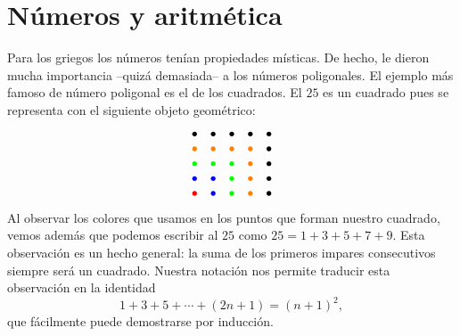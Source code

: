 \chapter{Números y aritmética}

Para los griegos los números tenían propiedades místicas. De hecho, le dieron
mucha importancia --quizá demasiada-- a los números poligonales.  El ejemplo
más famoso de número poligonal es el de los cuadrados. El $25$ es un cuadrado
pues se representa con el siguiente objeto geométrico:
\[
\begin{array}{ccccc}
	\bullet & \bullet & \bullet & \bullet & \bullet\\
	\textcolor{orange}{\bullet} & \textcolor{orange}{\bullet} & \textcolor{orange}{\bullet} & \textcolor{orange}{\bullet} & \bullet\\
	\textcolor{green}{\bullet} & \textcolor{green}{\bullet} & \textcolor{green}{\bullet} & \textcolor{orange}{\bullet} & \bullet\\
	\textcolor{blue}\bullet & \textcolor{blue}{\bullet} & \textcolor{green}{\bullet}     & \textcolor{orange}{\bullet} & \bullet\\
	\textcolor{red}{\bullet} & \textcolor{blue}{\bullet} & \textcolor{green}{\bullet}    & \textcolor{orange}{\bullet} & \bullet
\end{array}
\]
Al observar los colores que usamos en los puntos que forman nuestro cuadrado,
vemos además que podemos escribir al $25$ como $25=1+3+5+7+9$. Esta observación
es un hecho general: la suma de los primeros impares consecutivos siempre será
un cuadrado. Nuestra notación nos permite traducir esta observación en la
identidad 
\[
	1+3+5+\cdots+(2n+1)=(n+1)^2,
\]
que fácilmente puede demostrarse por inducción. 

